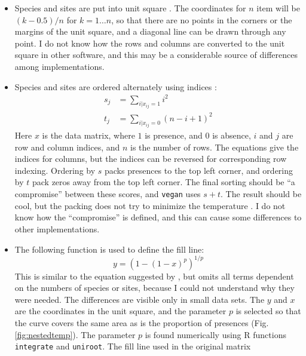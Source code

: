 \documentclass[a4paper,10pt]{amsart}
\begin{document}
\begin{itemize}
\item Species and sites are put into unit square \citep{RodGir06}. The
  coordinates for $n$ item will be $(k-0.5)/n$ for $k=1 \ldots n$, so
  that there are no points in the corners or the margins of the unit
  square, and a diagonal line can be drawn through any point. I do not
  know how the rows and columns are converted to the unit square in
  other software, and this may be a considerable source of differences
  among implementations.
  \item Species and sites are ordered alternately using indices
    \citep{RodGir06}:
    \begin{equation}
    \begin{split}
      s_j &= \sum_{i|x_{ij} = 1} i^2 \\
      t_j &= \sum_{i|x_{ij} = 0} (n-i+1)^2 
    \end{split}
    \end{equation}
    Here $x$ is the data matrix, where $1$ is presence, and $0$ is
    absence, $i$ and $j$ are row and column indices, and $n$ is the
    number of rows. The equations give the indices for columns, but
    the indices can be reversed for corresponding row indexing.
    Ordering by $s$ packs presences to the top left corner, and
    ordering by $t$ pack zeros away from the top left corner. The final
    sorting should be ``a compromise'' \cite{RodGir06} between these
    scores, and \texttt{vegan} uses $s+t$.  The result should be cool,
    but the packing does not try to minimize the temperature
    \citep{RodGir06}.  I do not know how the ``compromise'' is
    defined, and this can cause some differences to other
    implementations.
  \item The following function is used to define the fill line:
    \begin{equation}
      y = (1-(1-x)^p)^{1/p}
    \end{equation}
    This is similar to the equation suggested by
    \cite[eq. 4]{RodGir06}, but omits all terms dependent on the
    numbers of species or sites, because I could not understand why
    they were needed. The differences are visible only in small data
    sets. The $y$ and $x$ are the coordinates in the unit square, and
    the parameter $p$ is selected so that the curve covers the same
    area as is the proportion of presences
    (Fig. \ref{fig:nestedtemp}). The parameter $p$ is found
    numerically using \textsf{R} functions \texttt{integrate} and
    \texttt{uniroot}.  The fill line used in the original matrix

\end{itemize}
\end{document}
